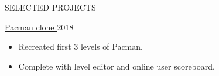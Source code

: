 \documentclass{resume}
\begin{document}
\begin{minipage}[t]{0.54\textwidth}
\begin{rsection}{\MakeUppercase{selected projects}}{}
\begin{rcontent}{\href{https://github.com/solomspd/pacman}{Pacman clone \hspace{0.25em} \iconin{\faGithub}}}{2018}{}{}
\begin{techtag}
			\item {}
			\item {}
		\end{techtag}
			\begin{itemize}
				\item Recreated first 3 levels of Pacman.
				\item Complete with level editor and online user scoreboard.
			\end{itemize}
		\end{rcontent}

	\end{rsection}

\end{minipage}
\hfill
\begin{minipage}[t]{0.45\textwidth}


\end{minipage}
\end{document}
